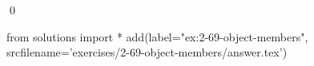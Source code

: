 
\begin{ex}
  \label{ex:2-69-object-members}
  
  \qed
\end{ex}
\begin{python0}
from solutions import *
add(label="ex:2-69-object-members",
    srcfilename='exercises/2-69-object-members/answer.tex')
\end{python0}
